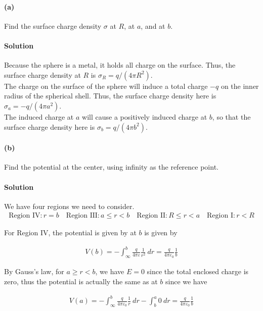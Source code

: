 \documentclass{article}
\begin{document}
\paragraph{(a)} Find the surface charge density $\sigma$ at $R$, at $a$, and at $b$. 

\paragraph{Solution} Because the sphere is a metal, it holds all charge on the surface. Thus, the surface charge density at $R$ is $\sigma_R = q/(4\pi R^2)$.\\

The charge on the surface of the sphere will induce a total charge $-q$ on the inner radius of the spherical shell. Thus, the surface charge density here is $\sigma_a = -q/(4\pi a^2)$. \\

The induced charge at $a$ will cause a positively induced charge at $b$, so that the surface charge density here is $\sigma_b = q/(4\pi b^2)$.

\paragraph{(b)} Find the potential at the center, using infinity as the reference point.

\paragraph{Solution} We have four regions we need to consider. 
\begin{align*}
    \text{Region IV}: r = b \quad \text{Region III}: a \leq r < b \quad \text{Region II}: R \leq r < a \quad \text{Region I}: r < R
\end{align*}

For Region IV, the potential is given by at $b$ is given by

\begin{align*}
    V(b) = -\int_{\infty}^b \frac{q}{4\pi \varepsilon}\frac{1}{r^2}\ dr = \frac{q}{4\pi\varepsilon_0}\frac{1}{b}
\end{align*}

By Gauss's law, for $a \geq r < b$, we have $E = 0$ since the total enclosed charge is zero, thus the potential is actually the same as at $b$ since we have 

\begin{align*}
    V(a) = -\int_{\infty}^b \frac{q}{4\pi\varepsilon_0}\frac{1}{r}\ dr - \int_b^a 0 \ dr = \frac{q}{4\pi \varepsilon_0}\frac{1}{b}
\end{align*}
\end{document}
